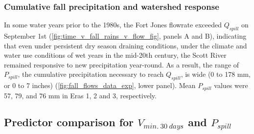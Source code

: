 \documentclass[
]{article}
\begin{document}
\hypertarget{cumulative-fall-precipitation-and-watershed-response}{%
\subsubsection{Cumulative fall precipitation and watershed
response}\label{cumulative-fall-precipitation-and-watershed-response}}

In some water years prior to the 1980s, the Fort Jones flowrate exceeded
\(Q_{spill}\) on September 1st
(\autoref{fig:time_v_fall_rains_v_flow_fig}, panels A and B), indicating
that even under persistent dry season draining conditions, under the
climate and water use conditions of wet years in the mid-20th century,
the Scott River remained responsive to new precipitation year-round. As
a result, the range of \(P_{spill}\), the cumulative precipitation
necessary to reach \(Q_{spill}\), is wide (0 to 178 mm, or 0 to 7
inches) (\autoref{fig:fall_flows_data_exp}, lower panel). Mean
\(P_{spill}\) values were 57, 79, and 76 mm in Eras 1, 2 and 3,
respectively.

\hypertarget{predictor-comparison-for-v_min.30days-and-p_spill}{%
\subsection{\texorpdfstring{Predictor comparison for
\(V_{min.~30~days}\) and
\(P_{spill}\)}{Predictor comparison for V\_\{min.\textasciitilde30\textasciitilde days\} and P\_\{spill\}}}\label{predictor-comparison-for-v_min.30days-and-p_spill}}
\end{document}
